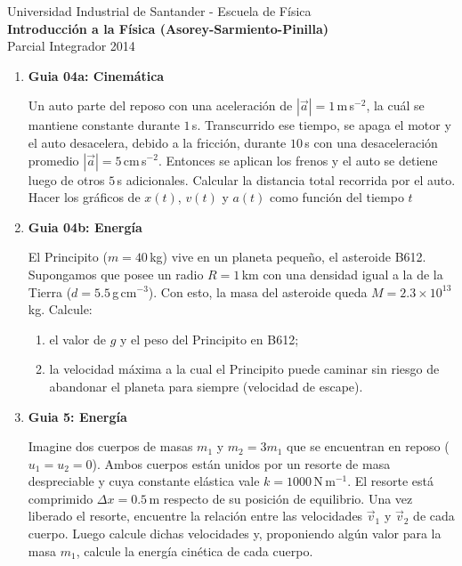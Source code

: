 \documentclass[a4paper,12pt]{article}
\begin{document}
\begin{center}
  {\small{Universidad Industrial de Santander - Escuela de Física}}\\
  {\bf{Introducción a la Física (Asorey-Sarmiento-Pinilla)}}\\
  Parcial Integrador 2014
\end{center}

\renewcommand{\labelenumi}{\arabic{enumi})}
\renewcommand{\labelenumii}{\arabic{enumii})}


\begin{enumerate}

  \item {\bf{Guia 04a: Cinemática}} 

    Un auto parte del reposo con una aceleración de $|\vec a|=1$\,m\,s$^{-2}$,
    la cuál se mantiene constante durante $1$\,s. Transcurrido ese tiempo, se
    apaga el motor y el auto desacelera, debido a la fricción, durante $10$\,s
    con una desaceleración promedio $|\vec a|=5$\,cm\,s$^{-2}$. Entonces se
    aplican los frenos y el auto se detiene luego de otros $5$\,s adicionales.
    Calcular la distancia total recorrida por el auto. Hacer los gráficos de
    $x(t)$, $v(t)$ y $a(t)$ como función del tiempo $t$

  \item {\bf{Guia 04b: Energía}}

    El Principito ($m=40$\,kg) vive en un planeta pequeño, el asteroide B612.
    Supongamos que posee un radio $R = 1$\,km con una densidad igual a la de la
    Tierra ($d = 5.5$\,g\,cm$^{-3}$). Con esto, la masa del asteroide queda
    $M=2.3\times 10^13$\,kg. Calcule:
    \begin{enumerate}
      \item el valor de $g$ y el peso del Principito en B612;
      \item la velocidad máxima a la cual el Principito puede caminar sin
        riesgo de abandonar el planeta para siempre (velocidad de escape).
    \end{enumerate}

  \item {\bf{Guia 5: Energía}} 

    Imagine dos cuerpos de masas $m_1$ y $m_2=3 m_1$ que se encuentran en
    reposo ($u_1=u_2=0$). Ambos cuerpos están unidos por un resorte de masa
    despreciable y cuya constante elástica vale $k=1000$\,N\,m$^{-1}$. El
    resorte está comprimido $\Delta x=0.5$\,m respecto de su posición de
    equilibrio. Una vez liberado el resorte, encuentre la relación entre las
    velocidades $\vec v_1$ y $\vec v_2$ de cada cuerpo. Luego calcule dichas
    velocidades y, proponiendo algún valor para la masa $m_1$, calcule la
    energía cinética de cada cuerpo.


\end{enumerate}
\end{document}

